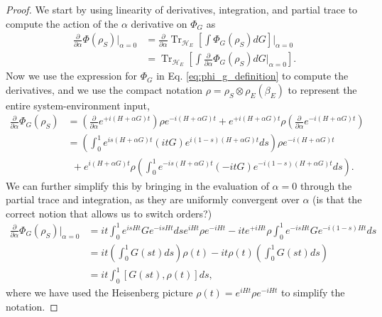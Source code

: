 \documentclass{article}
\newcommand{\parens}[1]{\left( #1 \right)}
\newcommand{\brackets}[1]{\left[ #1 \right]}
\DeclareMathOperator{\Tr}{Tr}
\newcommand{\partrace}[2]{\Tr_{#1} \brackets{ #2 }}
\begin{document}
\begin{proof}
    We start by using linearity of derivatives, integration, and partial trace to compute the action of the $\alpha$ derivative on $\Phi_G$ as
    \begin{align}
        \frac{\partial}{\partial \alpha} \Phi(\rho_S) \bigg|_{\alpha = 0} &= \frac{\partial}{\partial \alpha} \partrace{\mathcal{H}_E}{\int \Phi_G(\rho_S) dG} \bigg|_{\alpha = 0} \\
         &= \partrace{\mathcal{H}_E}{\int \frac{\partial}{\partial \alpha} \Phi_G(\rho_S) dG \bigg|_{\alpha = 0} } .
    \end{align}
    Now we use the expression for $\Phi_G$ in Eq. \eqref{eq:phi_g_definition} to compute the derivatives, and we use the compact notation $\rho = \rho_S \otimes \rho_E(\beta_E)$ to represent the entire system-environment input,
    \begin{align}
        \frac{\partial}{\partial \alpha} \Phi_G (\rho_S) &= \parens{\frac{\partial}{\partial \alpha} e^{+ i (H + \alpha G)t}} \rho e^{-i (H + \alpha G) t} + e^{+i (H + \alpha G)t} \rho \parens{\frac{\partial}{\partial \alpha} e^{- i (H + \alpha G)t}} \\
        &= \parens{\int_{0}^{1} e^{i s (H+\alpha G)t} (i t G) e^{i (1-s) (H+\alpha G)t} ds} \rho e^{-i(H+\alpha G)t} \nonumber \\
    &~ ~+ e^{i(H+\alpha G)t} \rho \parens{\int_{0}^1 e^{-i s (H+\alpha G) t} (- i t G) e^{-i (1-s) (H+\alpha G)t} ds}. \label{eq:first_order_alpha_derivative}
    \end{align}
    We can further simplify this by bringing in the evaluation of $\alpha = 0$ through the partial trace and integration, as they are uniformly convergent over $\alpha$ (is that the correct notion that allows us to switch orders?)
    \begin{align}
        \frac{\partial}{\partial \alpha} \Phi_G(\rho_S) \bigg|_{\alpha = 0} &= i t \int_0^1 e^{i s H t} G e^{-i s H t} ds e^{i H t} \rho e^{-i H t} - i t e^{+i H t} \rho \int_0^1 e^{-is H t} G e^{-i(1-s) Ht} ds \\
        &= i t \parens{\int_0^1 G(s t) ds} \rho(t) - it \rho(t) \parens{\int_0^1 G(s t) ds} \\
        &= i t \int_0^1 [G(s t), \rho(t)] ds,
    \end{align}
    where we have used the Heisenberg picture $\rho(t) = e^{i H t} \rho e^{-i H t}$ to simplify the notation.


\end{proof}
\end{document}
